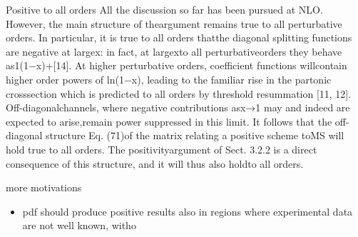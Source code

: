 \documentclass[9pt]{beamer}
\begin{document}
\begin{frame}{Positive to all orders}
    All the discussion so far has been pursued at NLO.  However, the main
    structure of theargument remains true to all perturbative orders.  In
    particular, it is true to all orders thatthe diagonal splitting functions
    are negative at largex:  in fact, at largexto all perturbativeorders they
    behave as1(1−x)+[14].  At higher perturbative orders, coefficient functions
    willcontain higher order powers of ln(1−x), leading to the familiar rise in
    the partonic crosssection  which  is  predicted  to  all  orders  by
    threshold  resummation  [11, 12].   Off-diagonalchannels,  where  negative
    contributions  asx→1  may  and  indeed  are  expected  to  arise,remain
    power  suppressed  in  this  limit.   It  follows  that  the  off-diagonal
    structure  Eq.  (71)of the matrix relating a positive scheme toMS will hold
    true to all orders.  The positivityargument of Sect. 3.2.2 is a direct
    consequence of this structure, and it will thus also holdto all orders.
\end{frame}

\begin{frame}{more motivations}
    \begin{itemize}
        \item pdf should produce positive results also in regions where experimental data are not well known, witho
    \end{itemize}
\end{frame}
\end{document}
